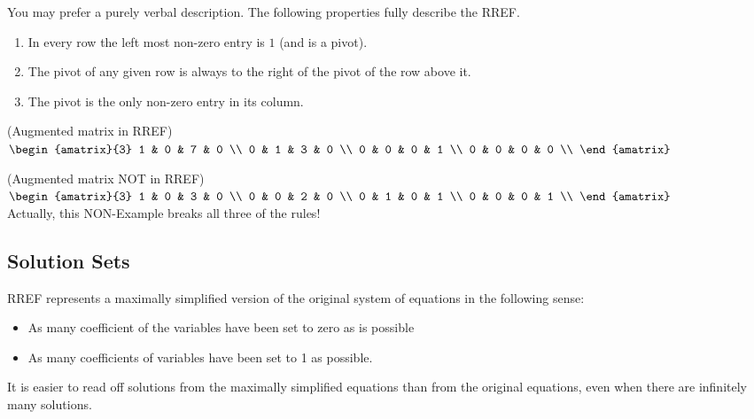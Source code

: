 \noindent
You may prefer a purely verbal description.
The following properties fully describe the RREF.

\begin{enumerate}
\item  In every row  the left most non-zero entry is  $1$ (and is a pivot).

\item The pivot of any given row is always to the right of the pivot of the row above it.

\item The pivot is the only non-zero entry in its column.
\end{enumerate}

\begin{example} (Augmented matrix in RREF)
$
\begin{amatrix}{3} 
1 & 0 & 7 & 0 \\ 
0 & 1 & 3 & 0 \\
0 & 0 & 0 & 1 \\
0 & 0 & 0 & 0 \\
\end{amatrix}
$
\end{example}

\begin{example} (Augmented matrix NOT in RREF)
$
\begin{amatrix}{3} 
1 & 0 & 3 & 0 \\ 
0 & 0 & 2 & 0 \\
0 & 1 & 0 & 1 \\
0 & 0 & 0 & 1 \\
\end{amatrix}
$\\
Actually, this NON-Example breaks all three of the rules!
\end{example}

\subsection{Solution Sets}
RREF represents a maximally simplified version of the original system of equations in the following sense: 
\begin{itemize}
\item As many coefficient of the variables have been set to zero as is possible 
\item As many coefficients of variables have been set to 1 as possible.
\end{itemize}
It is easier to read off solutions from the maximally simplified equations than from the original equations, even when there are infinitely many solutions.

